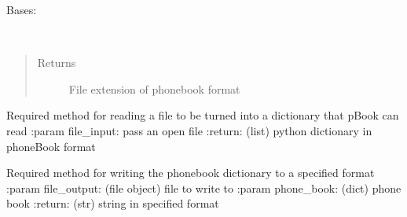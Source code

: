 \documentclass[letterpaper,10pt,english]{sphinxmanual}
\begin{document}
\begin{fulllineitems}
\label{\detokenize{phonebook.supported_filetypes:phonebook.supported_filetypes.filetypes_abstract.PhoneBookABC}}
Bases: 

\begin{fulllineitems}
\label{\detokenize{phonebook.supported_filetypes:phonebook.supported_filetypes.filetypes_abstract.PhoneBookABC.filetype}}~\begin{quote}\begin{description}
\item[{Returns}] \leavevmode
File extension of phonebook format

\end{description}\end{quote}

\end{fulllineitems}


\begin{fulllineitems}
\label{\detokenize{phonebook.supported_filetypes:phonebook.supported_filetypes.filetypes_abstract.PhoneBookABC.read_from}}
Required method for reading a file to be turned into a dictionary that pBook can read
:param file\_input: pass an open file
:return: (list) python dictionary in phoneBook format

\end{fulllineitems}


\begin{fulllineitems}
\label{\detokenize{phonebook.supported_filetypes:phonebook.supported_filetypes.filetypes_abstract.PhoneBookABC.write_to}}
Required method for writing the phonebook dictionary to a specified format
:param file\_output: (file object) file to write to
:param phone\_book: (dict) phone book
:return: (str) string in specified format

\end{fulllineitems}


\end{fulllineitems}
\end{document}

